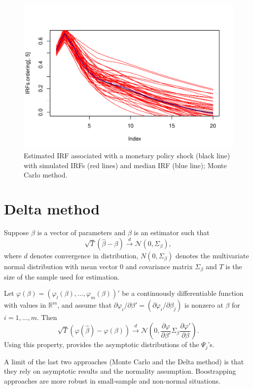 \documentclass[
  12pt,
]{book}
\theoremstyle{definition}
\theoremstyle{definition}
\theoremstyle{definition}
\theoremstyle{definition}
\theoremstyle{remark}
\begin{document}
\begin{figure}
\includegraphics[width=0.95\linewidth]{IdentifStructShocks_files/figure-latex/inference1bis-1} \caption{Estimated IRF associated with a monetary policy shock (black line) with simulated IRFs (red lines) and median IRF (blue line); Monte Carlo method.}\label{fig:inference1bis}
\end{figure}

\section{Delta method}\label{delta-method}

Suppose \(\beta\) is a vector of parameters and \(\beta\) is an estimator such that
\[
\sqrt{T}(\hat\beta-\beta)\overset{d}{\rightarrow}\mathcal{N}(0,\Sigma_\beta),
\]
where \(d\) denotes convergence in distribution, \(N(0,\Sigma_\beta)\) denotes the multivariate normal distribution with mean vector 0 and covariance matrix \(\Sigma_\beta\) and \(T\) is the size of the sample used for estimation.

Let \(\varphi(\beta) = (\varphi_l(\beta),..., \varphi_m(\beta))'\) be a continuously differentiable function with values in \(\mathbb{R}^m\), and assume that \(\partial \varphi_i/\partial
\beta' = (\partial \varphi_i/\partial \beta_j)\) is nonzero at \(\beta\) for \(i = 1,\dots, m\). Then
\[
\sqrt{T}(\varphi(\hat\beta)-\varphi(\beta))\overset{d}{\rightarrow}\mathcal{N}\left(0,\frac{\partial \varphi}{\partial \beta'}\Sigma_\beta\frac{\partial \varphi'}{\partial \beta}\right).
\]
Using this property, \citet{Lutkepohl_1990} provides the asymptotic distributions of the \(\Psi_j\)'s.

A limit of the last two approaches (Monte Carlo and the Delta method) is that they rely on asymptotic results and the normality assumption. Boostrapping approaches are more robust in small-sample and non-normal situations.
\end{document}
